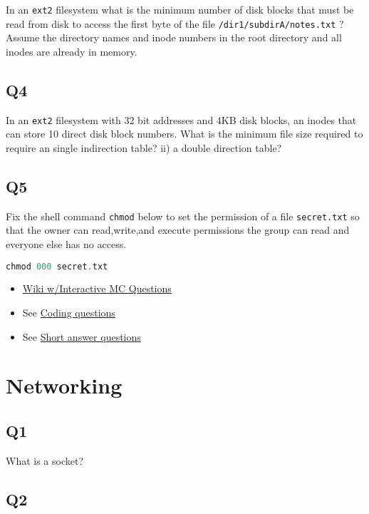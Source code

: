 In an \texttt{ext2} filesystem what is the minimum number of disk blocks that must be read from disk to access the first byte of the file \texttt{/dir1/subdirA/notes.txt} ? Assume the directory names and inode numbers in the root directory and all inodes are already in memory.

\subsection{Q4}\label{q4-3}

In an \texttt{ext2} filesystem with 32 bit addresses and 4KB disk blocks, an inodes that can store 10 direct disk block numbers. What is the minimum file size required to require an single indirection table? ii) a double direction table?

\subsection{Q5}\label{q5-2}

Fix the shell command \texttt{chmod} below to set the permission of a file \texttt{secret.txt} so that the owner can read,write,and execute permissions the group can read and everyone else has no access.

\begin{lstlisting}[language=C]
chmod 000 secret.txt
\end{lstlisting}

\begin{itemize}
\tightlist
\item
  \href{http://angrave.github.io/SystemProgramming/networkingreviewquestions.html}{Wiki w/Interactive MC Questions}
\item
  See \protect\hyperlink{coding-questions}{Coding questions}
\item
  See \protect\hyperlink{short-answer-questions}{Short answer questions}
\end{itemize}

\section{Networking}

\subsection{Q1}\label{q1-5}

What is a socket?

\subsection{Q2}\label{q2-5}

